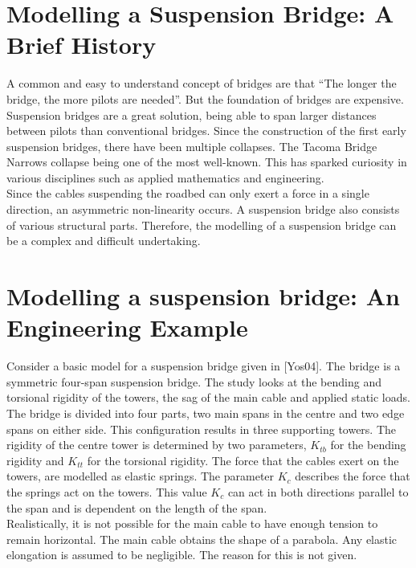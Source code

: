 \documentclass[../../main.tex]{subfiles}
\begin{document}
\section{Modelling a Suspension Bridge: A Brief History}
A common and easy to understand concept of bridges are that ``The longer the bridge, the more pilots are needed''. But the foundation of bridges are expensive. Suspension bridges are a great solution, being able to span larger distances between pilots than conventional bridges. Since the construction of the first early suspension bridges, there have been multiple collapses. The Tacoma Bridge Narrows collapse being one of the most well-known. This has sparked curiosity in various disciplines such as applied mathematics and engineering.\\

Since the cables suspending the roadbed can only exert a force in a single direction, an asymmetric non-linearity occurs. A suspension bridge also consists of various structural parts. Therefore, the modelling of a suspension bridge can be a complex and difficult undertaking.


\section{Modelling a suspension bridge: An Engineering Example}
Consider a basic model for a suspension bridge given in [Yos04]. The bridge is a symmetric four-span suspension bridge. The study looks at the bending and torsional rigidity of the towers, the sag of the main cable and applied static loads.
\\ 

The bridge is divided into four parts, two main spans in the centre and two edge spans on either side. This configuration results in three supporting towers. The rigidity of the centre tower is determined by two parameters, $K_{tb}$ for the bending rigidity and $K_{tt}$ for the torsional rigidity. The force that the cables exert on the towers, are modelled as elastic springs. The parameter $K_c$ describes the force that the springs act on the towers. This value $K_c$ can act in both directions parallel to the span and is dependent on the length of the span.\\

Realistically, it is not possible for the main cable to have enough tension to remain horizontal. The main cable obtains the shape of a parabola. Any elastic elongation is assumed to be negligible. The reason for this is not given.\\
\end{document}
